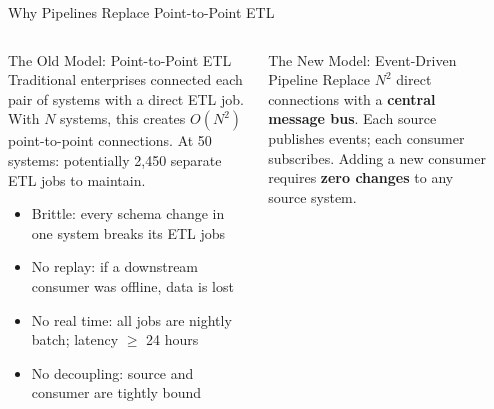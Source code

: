 \documentclass[aspectratio=169,10pt]{beamer}
\begin{document}
\begin{frame}{Why Pipelines Replace Point-to-Point ETL}
  \begin{columns}[T]
      \begin{block}{The Old Model: Point-to-Point ETL}
        Traditional enterprises connected each pair of systems with a direct ETL job.  With $N$ systems, this creates $O(N^2)$ point-to-point connections.  At 50 systems: potentially 2{,}450 separate ETL jobs to maintain.
        \vspace{4pt}
        \begin{itemize}
          \item Brittle: every schema change in one system breaks its ETL jobs
          \item No replay: if a downstream consumer was offline, data is lost
          \item No real time: all jobs are nightly batch; latency $\geq$ 24 hours
          \item No decoupling: source and consumer are tightly bound
        \end{itemize}
      \end{block}
      \vspace{4pt}
      \begin{alertblock}{The New Model: Event-Driven Pipeline}
        Replace $N^2$ direct connections with a \textbf{central message bus}.  Each source publishes events; each consumer subscribes.  Adding a new consumer requires \textbf{zero changes} to any source system.
      \end{alertblock}

      \begin{center}
\end{center}
\end{columns}
\end{frame}
\end{document}
